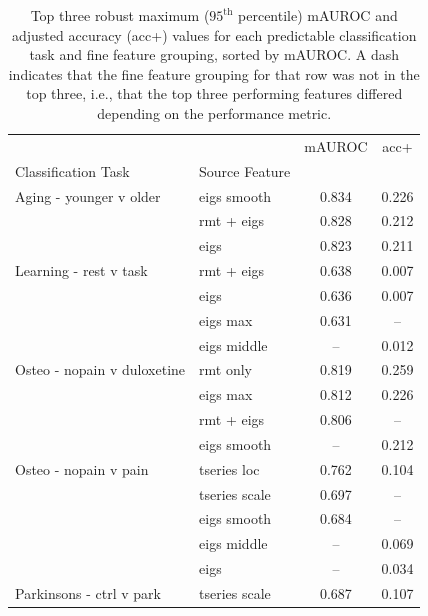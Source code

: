 \documentclass[12pt]{spieman}  %
\begin{document}
\begin{spacing}{2}
\begin{table}[h!]
\caption{
\label{tab:top3-fine}
Top three robust maximum (\(95^{\text{th}}\) percentile) mAUROC and adjusted
accuracy (acc+) values for each predictable classification task and fine
feature grouping, sorted by mAUROC. A dash indicates that the fine feature
grouping for that row was not in the top three, i.e., that the top three
performing features differed depending on the performance metric. }
\small
\centering
\begin{tabular}{llcc}
\hline
                                   &               & mAUROC &   acc+ \\
Classification Task                & Source Feature&        &        \\
\hline
Aging - younger v older            & eigs smooth   &  0.834 &  0.226 \\
                                   & rmt + eigs    &  0.828 &  0.212 \\
                                   & eigs          &  0.823 &  0.211 \\
Learning - rest v task             & rmt + eigs    &  0.638 &  0.007 \\
                                   & eigs          &  0.636 &  0.007 \\
                                   & eigs max      &  0.631 &    –   \\
                                   & eigs middle   &    –   &  0.012 \\
Osteo - nopain v duloxetine        & rmt only      &  0.819 &  0.259 \\
                                   & eigs max      &  0.812 &  0.226 \\
                                   & rmt + eigs    &  0.806 &    –   \\
                                   & eigs smooth   &    –   &  0.212 \\
Osteo - nopain v pain              & tseries loc   &  0.762 &  0.104 \\
                                   & tseries scale &  0.697 &    –   \\
                                   & eigs smooth   &  0.684 &    –   \\
                                   & eigs middle   &    –   &  0.069 \\
                                   & eigs          &    –   &  0.034 \\
Parkinsons - ctrl v park           & tseries scale &  0.687 &  0.107 \\

\end{tabular}
\end{table}
\end{spacing}
\end{document}
